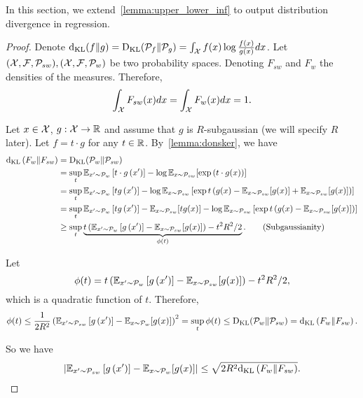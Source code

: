 In this section, we extend~\cref{lemma:upper_lower_inf} to output distribution divergence in regression.

\begin{proof}

Denote $ \mathrm{d}_{\mathrm{KL}}(f \| g) = \mathrm{D}_{\mathrm{KL}}(\mathcal{P}_f \| \mathcal{P}_g) =\int_{\mathcal{X}} f(x) \log \frac{f(x)}{g(x)} d x$.
Let $(\mathcal{X}, \mathcal{F}, \mathcal{P}_{sw}),(\mathcal{X}, \mathcal{F}, \mathcal{P}_w)$ be two probability spaces.
Denoting $F_{sw}$ and $F_w$ the densities of the measures.
Therefore,
$$\int_{\mathcal{X}} F_{sw}(x) d x = \int_{\mathcal{X}} F_w(x) d x = 1.$$

Let $x \in \mathcal{X}$, $g: \mathcal{X} \to \mathbb{R}$ and assume that $g$ is $R$-subgaussian (we will specify $R$ later).
Let $f=t \cdot g$ for any $t \in \mathbb{R}$. By~\cref{lemma:donsker}, we have
\begin{align*}
\mathrm{d}_{\mathrm{KL}}\left( F_w \| F_{sw} \right) & = \mathrm{D}_{\mathrm{KL}}(\mathcal{P}_w \| \mathcal{P}_{sw}) \\ & = \sup_t \mathbb{E}_{x^{\prime} \sim \mathcal{P}_w}\left[t \cdot g\left(x^{\prime}\right)\right]-\log \mathbb{E}_{x \sim \mathcal{P}_{sw}}[\exp \left(t \cdot g(x) \right)] \\
& =\sup _t \mathbb{E}_{x^{\prime} \sim \mathcal{P}_w}\left[tg\left(x^{\prime}\right)\right]-\log \mathbb{E}_{x \sim \mathcal{P}_{sw}}\left[\exp t\left(g(x)-\mathbb{E}_{x \sim \mathcal{P}_{sw}}[g(x)]+\mathbb{E}_{x \sim \mathcal{P}_{sw}}[g(x)]\right)\right] \\
& =\sup _t \mathbb{E}_{x^{\prime} \sim \mathcal{P}_w}\left[t g\left(x^{\prime}\right)\right]-\mathbb{E}_{x \sim \mathcal{P}_{sw}}[tg(x)]-\log \mathbb{E}_{x \sim \mathcal{P}_{sw}}\left[\exp t\left(g(x)-\mathbb{E}_{x \sim \mathcal{P}_{sw}}[g(x)]\right)\right] \\
& \geq \sup _t \underbrace{t\left(\mathbb{E}_{x^{\prime} \sim \mathcal{P}_w}\left[g\left(x^{\prime}\right)\right]-\mathbb{E}_{x \sim \mathcal{P}_{sw}}[g(x)]\right)-t^2 R^2 / 2}_{\phi(t)}. \tag{Subgaussianity}
\end{align*}

Let
$$\phi(t)=t\left(\mathbb{E}_{x^{\prime} \sim \mathcal{P}_w}\left[g\left(x^{\prime}\right)\right]-\mathbb{E}_{x \sim \mathcal{P}_{sw}}[g(x)]\right)-t^2 R^2 / 2,$$
which is a quadratic function of $t$.
Therefore, 
\begin{align*}
    \phi(t) \le \frac{1}{2R^2}\left(\mathbb{E}_{x^{\prime} \sim \mathcal{P}_{sw}}\left[g\left(x^{\prime}\right)\right]-\mathbb{E}_{x \sim \mathcal{P}_w}[g(x)]\right)^2 = \sup _t \phi(t) \le \mathrm{D}_{\mathrm{KL}}(\mathcal{P}_w \| \mathcal{P}_{sw}) = \mathrm{d}_{\mathrm{KL}}\left( F_w \| F_{sw} \right).
\end{align*}

So we have
\begin{align} \label{ineq:kl_upp}
\left|\mathbb{E}_{x^{\prime} \sim \mathcal{P}_{sw}}\left[g\left(x^{\prime}\right)\right]-\mathbb{E}_{x \sim \mathcal{P}_w}[g(x)]\right| \le \sqrt{2R^2 \mathrm{d}_{\mathrm{KL}}\left( F_w \| F_{sw} \right)}.
\end{align}


\end{proof}

